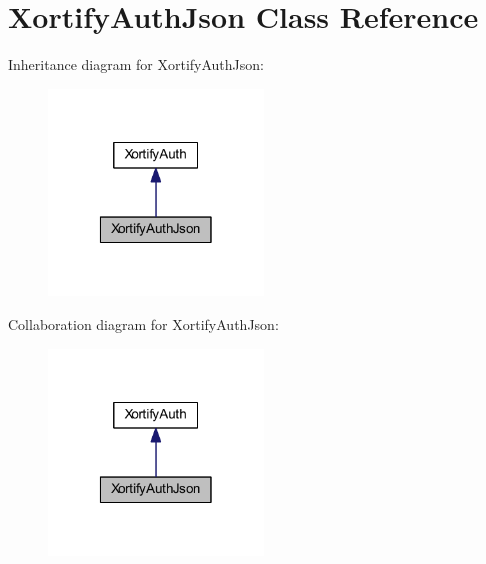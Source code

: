 \hypertarget{class_xortify_auth_json}{\section{Xortify\-Auth\-Json Class Reference}
\label{class_xortify_auth_json}
}


Inheritance diagram for Xortify\-Auth\-Json\-:
\nopagebreak
\begin{figure}[H]
\begin{center}
\leavevmode
\includegraphics[width=162pt]{class_xortify_auth_json__inherit__graph}
\end{center}
\end{figure}


Collaboration diagram for Xortify\-Auth\-Json\-:
\nopagebreak
\begin{figure}[H]
\begin{center}
\leavevmode
\includegraphics[width=162pt]{class_xortify_auth_json__coll__graph}
\end{center}
\end{figure}
